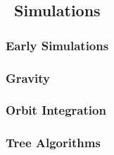 \subsection{\nbody\ Simulations}
\label{subsec:computational_theory--nbody_simulations}



\subsubsection{Early Simulations}
\label{subsubsec:computational_theory--nbody_simulations--early_simulations}



\subsubsection{Gravity}
\label{subsubsec:computational_theory--nbody_simulations--gravity}



\subsubsection{Orbit Integration}
\label{subsubsec:computational_theory--nbody_simulations--orbit_integration}



\subsubsection{Tree Algorithms}
\label{subsubsec:computational_theory--nbody_simulations--tree_algorithms}




